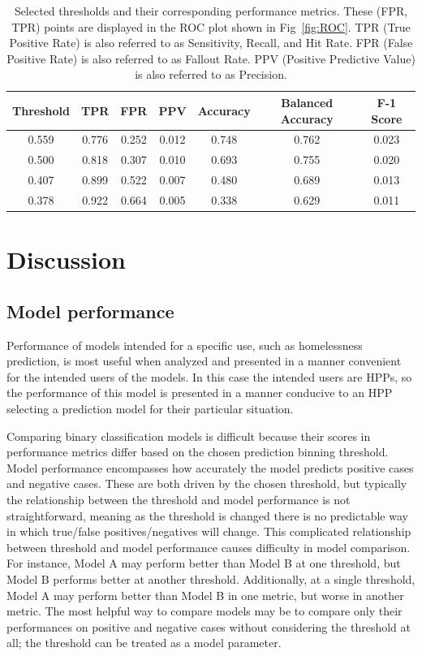 \documentclass[10pt,letterpaper]{article}
\begin{document}
\begin{table}[htb]
    \centering
    \begin{tabular}{ccccccc}
        \toprule
        Threshold   &   TPR &   FPR & PPV   & Accuracy  &  Balanced Accuracy    & F-1 Score \\
        \midrule
        0.559       & 0.776 & 0.252 & 0.012 &     0.748 &     0.762             & 0.023 \\
        0.500       & 0.818 & 0.307 & 0.010 &     0.693 &     0.755             & 0.020 \\
        0.407       & 0.899 & 0.522 & 0.007 &     0.480 &     0.689             & 0.013 \\
        0.378       & 0.922 & 0.664 & 0.005 &     0.338 &     0.629             & 0.011 \\
        \bottomrule
    \end{tabular}
    \caption{Selected thresholds and their corresponding performance metrics. These (FPR, TPR) points are displayed in the ROC plot shown in Fig~\ref{fig:ROC}. TPR (True Positive Rate) is also referred to as Sensitivity, Recall, and Hit Rate. FPR (False Positive Rate) is also referred to as Fallout Rate. PPV (Positive Predictive Value) is also referred to as Precision.}
    \label{tbl:performance}
\end{table}

\section*{Discussion}
\subsection*{Model performance}
Performance of models intended for a specific use, such as homelessness prediction, is most useful when analyzed and presented in a manner convenient for the intended users of the models. In this case the intended users are HPPs, so the performance of this model is presented in a manner conducive to an HPP selecting a prediction model for their particular situation.

Comparing binary classification models is difficult because their scores in performance metrics differ based on the chosen prediction binning threshold. Model performance encompasses how accurately the model predicts positive cases and negative cases. These are both driven by the chosen threshold, but typically the relationship between the threshold and model performance is not straightforward, meaning as the threshold is changed there is no predictable way in which true/false positives/negatives will change. This complicated relationship between threshold and model performance causes difficulty in model comparison. For instance, Model A may perform better than Model B at one threshold, but Model B performs better at another threshold. Additionally, at a single threshold, Model A may perform better than Model B in one metric, but worse in another metric. The most helpful way to compare models may be to compare only their performances on positive and negative cases without considering the threshold at all; the threshold can be treated as a model parameter.
\end{document}
